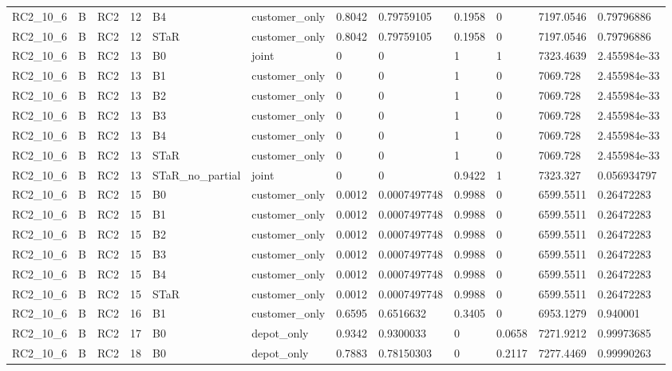 \begin{longtable}{llllllllllll}
RC2\_10\_6 & B & RC2 & 12 & B4 & customer\_only & 0.8042 & 0.79759105 & 0.1958 & 0 & 7197.0546 & 0.79796886 \\
RC2\_10\_6 & B & RC2 & 12 & STaR & customer\_only & 0.8042 & 0.79759105 & 0.1958 & 0 & 7197.0546 & 0.79796886 \\
RC2\_10\_6 & B & RC2 & 13 & B0 & joint & 0 & 0 & 1 & 1 & 7323.4639 & 2.455984e-33 \\
RC2\_10\_6 & B & RC2 & 13 & B1 & customer\_only & 0 & 0 & 1 & 0 & 7069.728 & 2.455984e-33 \\
RC2\_10\_6 & B & RC2 & 13 & B2 & customer\_only & 0 & 0 & 1 & 0 & 7069.728 & 2.455984e-33 \\
RC2\_10\_6 & B & RC2 & 13 & B3 & customer\_only & 0 & 0 & 1 & 0 & 7069.728 & 2.455984e-33 \\
RC2\_10\_6 & B & RC2 & 13 & B4 & customer\_only & 0 & 0 & 1 & 0 & 7069.728 & 2.455984e-33 \\
RC2\_10\_6 & B & RC2 & 13 & STaR & customer\_only & 0 & 0 & 1 & 0 & 7069.728 & 2.455984e-33 \\
RC2\_10\_6 & B & RC2 & 13 & STaR\_no\_partial & joint & 0 & 0 & 0.9422 & 1 & 7323.327 & 0.056934797 \\
RC2\_10\_6 & B & RC2 & 15 & B0 & customer\_only & 0.0012 & 0.0007497748 & 0.9988 & 0 & 6599.5511 & 0.26472283 \\
RC2\_10\_6 & B & RC2 & 15 & B1 & customer\_only & 0.0012 & 0.0007497748 & 0.9988 & 0 & 6599.5511 & 0.26472283 \\
RC2\_10\_6 & B & RC2 & 15 & B2 & customer\_only & 0.0012 & 0.0007497748 & 0.9988 & 0 & 6599.5511 & 0.26472283 \\
RC2\_10\_6 & B & RC2 & 15 & B3 & customer\_only & 0.0012 & 0.0007497748 & 0.9988 & 0 & 6599.5511 & 0.26472283 \\
RC2\_10\_6 & B & RC2 & 15 & B4 & customer\_only & 0.0012 & 0.0007497748 & 0.9988 & 0 & 6599.5511 & 0.26472283 \\
RC2\_10\_6 & B & RC2 & 15 & STaR & customer\_only & 0.0012 & 0.0007497748 & 0.9988 & 0 & 6599.5511 & 0.26472283 \\
RC2\_10\_6 & B & RC2 & 16 & B1 & customer\_only & 0.6595 & 0.6516632 & 0.3405 & 0 & 6953.1279 & 0.940001 \\
RC2\_10\_6 & B & RC2 & 17 & B0 & depot\_only & 0.9342 & 0.9300033 & 0 & 0.0658 & 7271.9212 & 0.99973685 \\
RC2\_10\_6 & B & RC2 & 18 & B0 & depot\_only & 0.7883 & 0.78150303 & 0 & 0.2117 & 7277.4469 & 0.99990263 \\

\end{longtable}
